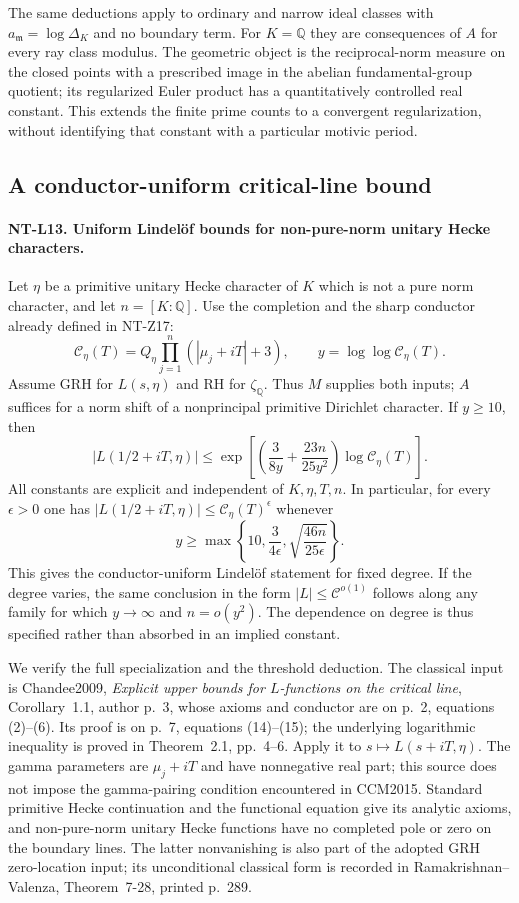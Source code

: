 \documentclass[11pt,a4paper]{article}
\begin{document}
The same deductions apply to ordinary and narrow ideal classes
with $a_{\mathfrak m}=\log\Delta_K$ and no boundary term.
For $K=\mathbb Q$ they are consequences of $A$ for every ray
class modulus.  The geometric object is the reciprocal-norm
measure on the closed points with a prescribed image in the
abelian fundamental-group quotient; its regularized Euler
product has a quantitatively controlled real constant.
This extends the finite prime counts to a convergent
regularization, without identifying that constant with a
particular motivic period.

\subsection{A conductor-uniform critical-line bound}

\paragraph{NT-L13. Uniform Lindel\"of bounds for non-pure-norm unitary Hecke characters.}
Let $\eta$ be a primitive unitary Hecke character of $K$ which is
not a pure norm character, and let $n=[K:\mathbb Q]$.
Use the completion and the sharp conductor already defined in
NT-Z17:
\[
 \mathscr C_\eta(T)=Q_\eta
                  \prod_{j=1}^n(|\mu_j+iT|+3),
 \qquad y=\log\log\mathscr C_\eta(T).
\]
Assume GRH for $L(s,\eta)$ and RH for $\zeta_{\mathbb Q}$.
Thus $M$ supplies both inputs; $A$ suffices for a norm shift
of a nonprincipal primitive Dirichlet character.
If $y\ge10$, then
\[
 |L(1/2+iT,\eta)|\le
  \exp\left[
    \left(\frac3{8y}+\frac{23n}{25y^2}\right)
                      \log\mathscr C_\eta(T)\right].
\tag{NT-L13}
\]
All constants are explicit and independent of $K,\eta,T,n$.
In particular, for every $\epsilon>0$ one has
$|L(1/2+iT,\eta)|\le\mathscr C_\eta(T)^\epsilon$ whenever
\[
 y\ge\max\left\{10,\frac3{4\epsilon},
                         \sqrt{\frac{46n}{25\epsilon}}\right\}.
\tag{NT-L13-threshold}
\]
This gives the conductor-uniform Lindel\"of statement for fixed
degree.  If the degree varies, the same conclusion in the form
$|L|\le\mathscr C^{o(1)}$ follows along any family for which
$y\to\infty$ and $n=o(y^2)$.  The dependence on degree is thus
specified rather than absorbed in an implied constant.

We verify the full specialization and the threshold deduction.
The classical input is Chandee2009, \emph{Explicit upper bounds
for $L$-functions on the critical line}, Corollary~1.1,
author p.~3, whose axioms and conductor are on p.~2,
equations (2)--(6).  Its proof is on p.~7, equations
(14)--(15); the underlying logarithmic inequality is proved
in Theorem~2.1, pp.~4--6.
Apply it to $s\mapsto L(s+iT,\eta)$.
The gamma parameters are $\mu_j+iT$ and have nonnegative
real part; this source does not impose the gamma-pairing
condition encountered in CCM2015.  Standard primitive Hecke
continuation and the functional equation give its analytic
axioms, and non-pure-norm unitary Hecke functions have no
completed pole or zero on the boundary lines.  The latter
nonvanishing is also part of the adopted GRH zero-location
input; its unconditional classical form is recorded in
Ramakrishnan--Valenza, Theorem~7-28, printed p.~289.
\end{document}
